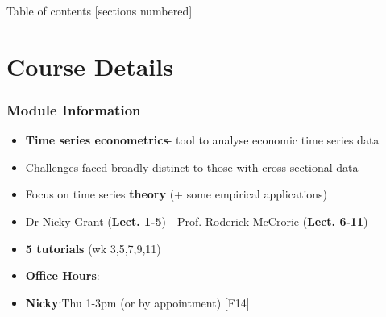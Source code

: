 \documentclass{beamer}
\title{\HUGE{Econometric Time Series Analysis$|$EC5221}}\subtitle{\vspace{4.5cm}\Large \textbf{Wk1: Stationary Univariate Time Series -\\ \textit{ARMA Processes and Stationarity} }}
\date{\large \textbf{Nicky Grant} (Semester 2, 2020/2021)}
\begin{document}
		\begin{center}\maketitle \end{center}
		 \small
		\begin{frame}{Table of contents}\small
			[sections numbered]
			\tableofcontents[hideallsubsections]
		\end{frame}
		\section{Course Details}
		
		
		\begin{frame}%
			\frametitle{Module Information}
			
			
			
			\begin{itemize}
				\large
				\item[] \textbf{Time series econometrics}- tool to analyse economic time series data
				
				\pause
				
				\vspace{10pt}
				\item[] Challenges faced broadly distinct to those with cross sectional data
				\pause
				
				\vspace{10pt}
				\item[] Focus on time series \textbf{theory} (+ some empirical applications)
				
				\pause
				
				
				\vspace{20pt}
				\item[] \href{mailto:nlg1@st-andrews.ac.uk}{Dr Nicky Grant} (\textbf{Lect. 1-5}) - \href{mailto:rm1@st-andrews.ac.uk}{Prof. Roderick McCrorie} (\textbf{Lect. 6-11})
				
				\vspace{10pt}
				
				\item[] \textbf{5 tutorials } (wk 3,5,7,9,11)
				\vspace{20pt}
				\pause
				\item[]\textbf{Office Hours}:
				\item[]\hspace{3.1cm} \textbf{Nicky}:Thu 1-3pm (or by appointment) [F14]\\
			
				
				
				
			\end{itemize}
			
			
		\end{frame}
		
\end{document}
